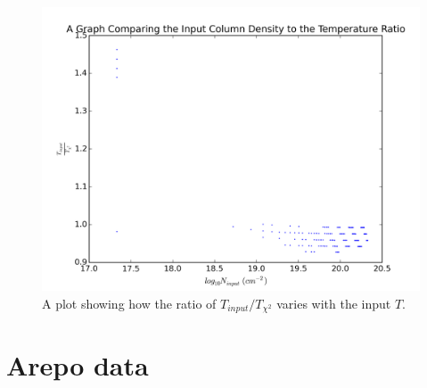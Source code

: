 \documentclass{report}
\begin{document}
\begin{figure}[H]
  \centering
  \includegraphics[width=0.4\linewidth]{../img/sim/T_ratio_inp.png}
  \caption{A plot showing how the ratio of $T_{input}/T_{\chi^{2}}$ varies with the input $T$.}\label{fig:T_ratio}
\end{figure}

\pagebreak
\section{Arepo data} \label{sec:sph}
\end{document}

